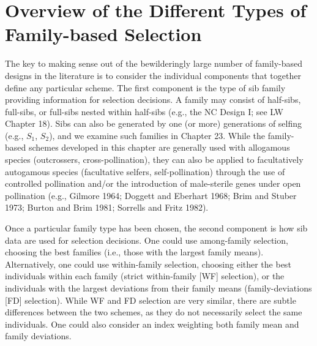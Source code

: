 \documentclass{article}
\begin{document}
\section{Overview of the Different Types of Family-based Selection}
The key to making sense out of the bewilderingly large number of family-based designs in the literature is to consider the individual components that together define any particular scheme. The first component is the type of sib family providing information for selection decisions. A family may consist of half-sibs, full-sibs, or full-sibs nested within half-sibs (e.g., the NC Design I; see LW Chapter 18). Sibs can also be generated by one (or more) generations of selfing (e.g.,  $ S_{1} $,  $ S_{2} $), and we examine such families in Chapter 23. While the family-based schemes developed in this chapter are generally used with allogamous species (outcrossers, cross-pollination), they can also be applied to facultatively autogamous species (facultative selfers, self-pollination) through the use of controlled pollination and/or the introduction of male-sterile genes under open pollination (e.g., Gilmore 1964; Doggett and Eberhart 1968; Brim and Stuber 1973; Burton and Brim 1981; Sorrells and Fritz 1982).

Once a particular family type has been chosen, the second component is how sib data are used for selection decisions. One could use among-family selection, choosing the best families (i.e., those with the largest family means). Alternatively, one could use within-family selection, choosing either the best individuals within each family (strict within-family [WF] selection), or the individuals with the largest deviations from their family means (family-deviations [FD] selection). While WF and FD selection are very similar, there are subtle differences between the two schemes, as they do not necessarily select the same individuals. One could also consider an index weighting both family mean and family deviations.
\end{document}

